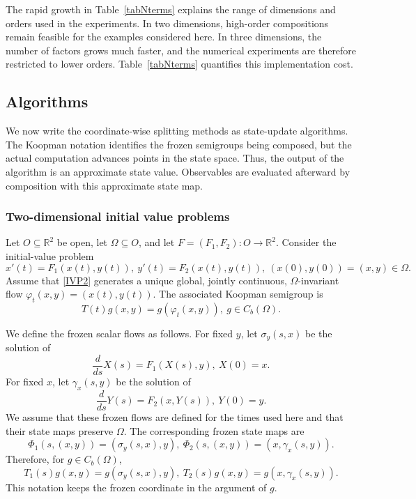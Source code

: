 \documentclass[preprint,1p,times,nopreprintline]{elsarticle}
\begin{document}
The rapid growth in Table~\ref{tabNterms} explains the range of dimensions and orders used in the experiments. In two dimensions, high-order compositions remain feasible for the examples considered here. In three dimensions, the number of factors grows much faster, and the numerical experiments are therefore restricted to lower orders. Table~\ref{tabNterms} quantifies this implementation cost.

\subsection{Algorithms}
\label{sec:alg}

We now write the coordinate-wise splitting methods as state-update algorithms. The Koopman notation identifies the frozen semigroups being composed, but the actual computation advances points in the state space. Thus, the output of the algorithm is an approximate state value. Observables are evaluated afterward by composition with this approximate state map.

\subsubsection{Two-dimensional initial value problems}

Let $O\subseteq\mathbb{R}^2$ be open, let $\Omega\subseteq O$, and let $F=(F_1,F_2):O\to\mathbb{R}^2$. Consider the initial-value problem
\begin{equation}
\label{IVP2}
x'(t)=F_1(x(t),y(t)),
~
y'(t)=F_2(x(t),y(t)),
~
(x(0),y(0))=(x,y)\in\Omega .
\end{equation}
Assume that \eqref{IVP2} generates a unique global, jointly continuous, $\Omega$-invariant flow $\varphi_t(x,y)=(x(t),y(t))$. The associated Koopman semigroup is
\[
T(t)g(x,y)=g(\varphi_t(x,y)),
~g\in C_b(\Omega).
\]

We define the frozen scalar flows as follows. For fixed $y$, let $\sigma_y(s,x)$ be the solution of
\[
\frac{d}{ds}X(s)=F_1(X(s),y),
~
X(0)=x.
\]
For fixed $x$, let $\gamma_x(s,y)$ be the solution of
\[
\frac{d}{ds}Y(s)=F_2(x,Y(s)),
~
Y(0)=y.
\]
We assume that these frozen flows are defined for the times used here and that their state maps preserve $\Omega$. The corresponding frozen state maps are
\[
\Phi_1(s,(x,y))=(\sigma_y(s,x),y),
~
\Phi_2(s,(x,y))=(x,\gamma_x(s,y)).
\]
Therefore, for $g\in C_b(\Omega)$,
\[
T_1(s)g(x,y)
=
g(\sigma_y(s,x),y),
~
T_2(s)g(x,y)
=
g(x,\gamma_x(s,y)).
\]
This notation keeps the frozen coordinate in the argument of $g$.
\end{document}
